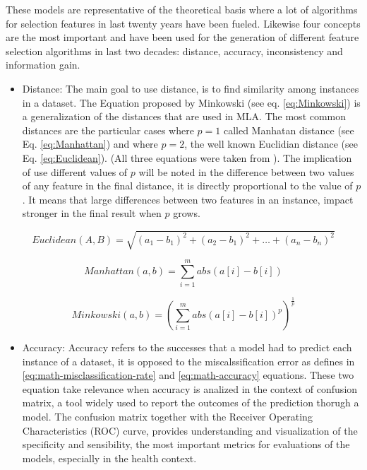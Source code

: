 \documentclass[]{book}
\providecommand{\tightlist}{%
  \setlength{\itemsep}{0pt}\setlength{\parskip}{0pt}}
\begin{document}
These models are representative of the theoretical basis where a lot of
algorithms for selection features in last twenty years have been fueled.
Likewise four concepts are the most important and have been used for the
generation of different feature selection algorithms in last two
decades: distance, accuracy, inconsistency and information gain.

\begin{itemize}
\tightlist
\item
  Distance: The main goal to use distance, is to find similarity among
  instances in a dataset. The Equation proposed by Minkowski (see eq.
  \eqref{eq:Minkowski}) is a generalization of the distances that are used
  in MLA. The most common distances are the particular cases where
  \(p=1\) called Manhatan distance (see Eq. \eqref{eq:Manhattan}) and
  where \(p=2\), the well known Euclidian distance (see Eq.
  \eqref{eq:Euclidean}). (All three equations were taken from
  \citep{Kelleher2015}). The implication of use different values of
  \(p\) will be noted in the difference between two values of any
  feature in the final distance, it is directly proportional to the
  value of \(p\). It means that large differences between two features
  in an instance, impact stronger in the final result when \(p\) grows.
\end{itemize}

\begin{equation}
      Euclidean(A,B)=\sqrt{(a_1-b_1)^2+(a_2-b_1)^2+\dots+(a_n-b_n)^2}
      \label{eq:Euclidean}
\end{equation}

\begin{equation}
      Manhattan(a,b)=\sum_{i=1}^{m}abs(a[i]-b[i])
      \label{eq:Manhattan}
\end{equation}

\begin{equation}
    Minkowski(a,b)=\left({\sum_{i=1}^{m}abs(a[i]-b[i])^p}\right)^{\frac{1}{p}}
    \label{eq:Minkowski}
\end{equation}

\begin{itemize}
\tightlist
\item
  Accuracy: Accuracy refers to the successes that a model had to predict
  each instance of a dataset, it is opposed to the miscalssification
  error as \citep{Kelleher2015} defines in
  \eqref{eq:math-misclassification-rate} and \eqref{eq:math-accuracy}
  equations. These two equation take relevance when accuracy is analized
  in the context of confusion matrix, a tool widely used to report the
  outcomes of the prediction thorugh a model. The confusion matrix
  together with the Receiver Operating Characteristics (ROC) curve,
  provides understanding and visualization of the specificity and
  sensibility, the most important metrics for evaluations of the models,
  especially in the health context.
\end{itemize}
\end{document}

